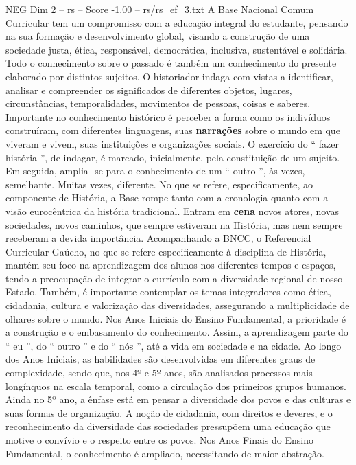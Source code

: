 \begin{textsample}{NEG Dim 2 – rs – Score -1.00 – rs/rs\_ef\_3.txt}  \label{ex:f2_neg_216}
A Base Nacional Comum Curricular tem um compromisso com a educação integral do estudante, pensando na sua formação e desenvolvimento global, visando a construção de uma sociedade justa, ética, responsável, democrática, inclusiva, sustentável e solidária.
Todo o conhecimento sobre o passado é também um conhecimento do presente elaborado por distintos sujeitos.
O historiador indaga com vistas a identificar, analisar e compreender os significados de diferentes objetos, lugares, circunstâncias, temporalidades, movimentos de pessoas, coisas e saberes.
Importante no conhecimento histórico é perceber a forma como os indivíduos construíram, com diferentes linguagens, suas \textbf{narrações} sobre o mundo em que viveram e vivem, suas instituições e organizações sociais.
O exercício do “ fazer história ”, de indagar, é marcado, inicialmente, pela constituição de um sujeito.
Em seguida, amplia -se para o conhecimento de um “ outro ”, às vezes, semelhante.
Muitas vezes, diferente.
No que se refere, especificamente, ao componente de História, a Base rompe tanto com a cronologia quanto com a visão eurocêntrica da história tradicional.
Entram em \textbf{cena} novos atores, novas sociedades, novos caminhos, que sempre estiveram na História, mas nem sempre receberam a devida importância.
Acompanhando a BNCC, o Referencial Curricular Gaúcho, no que se refere especificamente à disciplina de História, mantém seu foco na aprendizagem dos alunos nos diferentes tempos e espaços, tendo a preocupação de integrar o currículo com a diversidade regional de nosso Estado.
Também, é importante contemplar os temas integradores como ética, cidadania, cultura e valorização das diversidades, assegurando a multiplicidade de olhares sobre o mundo.
Nos Anos Iniciais do Ensino Fundamental, a prioridade é a construção e o embasamento do conhecimento.
Assim, a aprendizagem parte do “ eu ”, do “ outro ” e do “ nós ”, até a vida em sociedade e na cidade.
Ao longo dos Anos Iniciais, as habilidades são desenvolvidas em diferentes graus de complexidade, sendo que, nos 4º e 5º anos, são analisados processos mais longínquos na escala temporal, como a circulação dos primeiros grupos humanos.
Ainda no 5º ano, a ênfase está em pensar a diversidade dos povos e das culturas e suas formas de organização.
A noção de cidadania, com direitos e deveres, e o reconhecimento da diversidade das sociedades pressupõem uma educação que motive o convívio e o respeito entre os povos.
Nos Anos Finais do Ensino Fundamental, o conhecimento é ampliado, necessitando de maior abstração.

\end{textsample}
